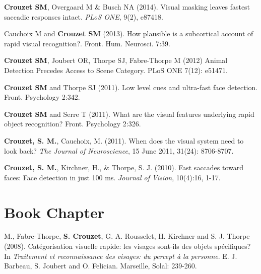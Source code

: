 \documentclass[margin,line]{resume}
\begin{document}
\begin{resume}
  	\vspace{-2mm}  \textbf{Crouzet SM}, Overgaard M \& Busch NA (2014). Visual masking leaves fastest saccadic responses intact. \textit{PLoS ONE}, 9(2), e87418.
	
	\vspace{-2mm} Cauchoix M and \textbf{Crouzet SM} (2013). How plausible is a subcortical account of rapid visual recognition?. Front. Hum. Neurosci. 7:39.
	
	\vspace{-2mm} \textbf{Crouzet SM}, Joubert OR, Thorpe SJ, Fabre-Thorpe M (2012) Animal Detection Precedes Access to Scene Category. PLoS ONE 7(12): e51471.

	\vspace{-2mm} \textbf{Crouzet SM} and Thorpe SJ (2011). Low level cues and ultra-fast face detection. Front. Psychology 2:342.

	\vspace{-2mm} \textbf{Crouzet SM} and Serre T (2011). What are the visual features underlying rapid object recognition? Front. Psychology 2:326.

	\vspace{-2mm} \textbf{Crouzet, S. M.}, Cauchoix, M. (2011). When does the visual system need to look back?  \textit{The Journal of Neuroscience}, 15 June 2011, 31(24): 8706-8707.

	\vspace{-2mm} \textbf{Crouzet, S. M.}, Kirchner, H., \& Thorpe, S. J.  (2010). Fast saccades toward faces: Face detection in just 100 ms. \textit{Journal of Vision}, 10(4):16, 1-17.
		


	\vspace{3mm}	
    \section{\mysidestyle Book Chapter}

M., Fabre-Thorpe, \textbf{S. Crouzet}, G. A. Rousselet, H. Kirchner and S. J. Thorpe (2008). Catégorisation visuelle rapide: les visages sont-ils des objets spécifiques? In \textsl{Traitement et reconnaissance des visages: du percept à la personne}. E. J. Barbeau, S. Joubert and O. Felician. Marseille, Solal: 239-260.


\end{resume}
\end{document}
